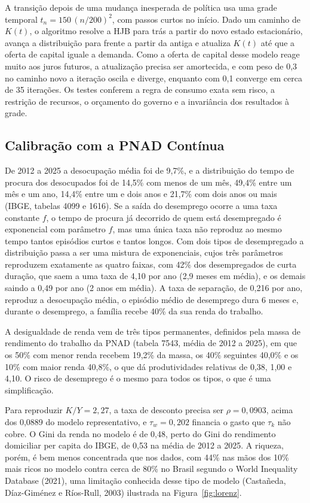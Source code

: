 \documentclass[11pt,a4paper]{article}
\begin{document}
A transição depois de uma mudança inesperada de política usa uma grade
temporal $t_n=150\,(n/200)^2$, com passos curtos no início. Dado um caminho de
$K(t)$, o algoritmo resolve a HJB para trás a partir do novo estado
estacionário, avança a distribuição para frente a partir da antiga e atualiza
$K(t)$ até que a oferta de capital iguale a demanda. Como a oferta de capital
desse modelo reage muito aos juros futuros, a atualização precisa ser
amortecida, e com peso de 0,3 no caminho novo a iteração oscila e diverge,
enquanto com 0,1 converge em cerca de 35 iterações. Os testes conferem a regra
de consumo exata sem risco, a restrição de recursos, o orçamento do governo e
a invariância dos resultados à grade.

\subsection{Calibração com a PNAD Contínua}
De 2012 a 2025 a desocupação média foi de 9,7\%, e a distribuição do tempo de
procura dos desocupados foi de 14,5\% com menos de um mês, 49,4\% entre um mês
e um ano, 14,4\% entre um e dois anos e 21,7\% com dois anos ou mais (IBGE,
tabelas 4099 e 1616). Se a saída do desemprego ocorre a uma taxa constante
$f$, o tempo de procura já decorrido de quem está desempregado é exponencial
com parâmetro $f$, mas uma única taxa não reproduz ao mesmo tempo tantos
episódios curtos e tantos longos. Com dois tipos de desempregado a
distribuição passa a ser uma mistura de exponenciais, cujos três parâmetros
reproduzem exatamente as quatro faixas, com 42\% dos desempregados de curta
duração, que saem a uma taxa de 4,10 por ano (2,9 meses em média), e os
demais saindo a 0,49 por ano (2 anos em média). A taxa de separação, de 0,216
por ano, reproduz a desocupação média, o episódio médio de desemprego dura 6
meses e, durante o desemprego, a família recebe 40\% da sua renda do
trabalho.

A desigualdade de renda vem de três tipos permanentes, definidos pela massa de
rendimento do trabalho da PNAD (tabela 7543, média de 2012 a 2025), em que os
50\% com menor renda recebem 19,2\% da massa, os 40\% seguintes 40,0\% e os
10\% com maior renda 40,8\%, o que dá produtividades relativas de 0,38, 1,00
e 4,10. O risco de desemprego é o mesmo para todos os tipos, o que é uma
simplificação.

Para reproduzir $K/Y=2{,}27$, a taxa de desconto precisa ser $\rho=0{,}0903$,
acima dos 0,0889 do modelo representativo, e $\tau_w=0{,}202$ financia o gasto
que $\tau_k$ não cobre. O Gini da renda no modelo é de 0,48, perto do Gini do
rendimento domiciliar per capita do IBGE, de 0,53 na média de 2012 a 2025. A
riqueza, porém, é bem menos concentrada que nos dados, com 44\% nas mãos dos
10\% mais ricos no modelo contra cerca de 80\% no Brasil segundo o World
Inequality Database (2021), uma limitação conhecida desse tipo de modelo
(Castañeda, Díaz-Giménez e Ríos-Rull, 2003) ilustrada na
Figura~\ref{fig:lorenz}.
\end{document}

